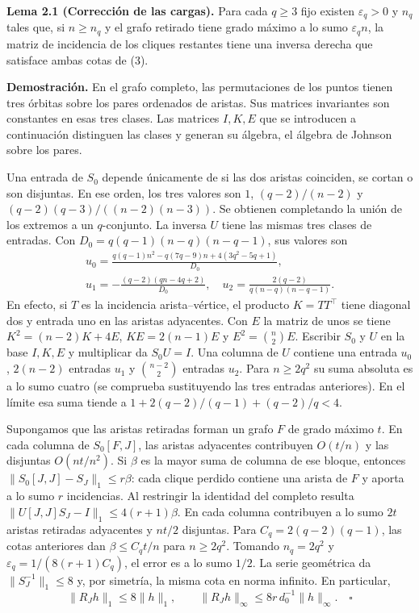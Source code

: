 \documentclass[spanish,11pt,a4paper]{article}
\begin{document}
\textbf{Lema 2.1 (Corrección de las cargas).} Para cada \(q\ge3\) fijo existen \(\varepsilon_q>0\) y \(n_q\) tales que, si \(n\ge n_q\) y el grafo retirado tiene grado máximo a lo sumo \(\varepsilon_q n\), la matriz de incidencia de los cliques restantes tiene una inversa derecha que satisface ambas cotas de (3).

\textbf{Demostración.} En el grafo completo, las permutaciones de los puntos tienen tres órbitas sobre los pares ordenados de aristas. Sus matrices invariantes son constantes en esas tres clases. Las matrices \(I,K,E\) que se introducen a continuación distinguen las clases y generan su álgebra, el álgebra de Johnson sobre los pares.

Una entrada de \(S_0\) depende únicamente de si las dos aristas coinciden, se cortan o son disjuntas. En ese orden, los tres valores son \(1\), \((q-2)/(n-2)\) y \((q-2)(q-3)/((n-2)(n-3))\). Se obtienen completando la unión de los extremos a un \(q\)-conjunto. La inversa \(U\) tiene las mismas tres clases de entradas. Con \(D_0=q(q-1)(n-q)(n-q-1)\), sus valores son \[\begin{gathered}u_0=\frac{q(q-1)n^2-q(7q-9)n+4(3q^2-5q+1)}{D_0},\\[3pt]
 u_1=-\frac{(q-2)(qn-4q+2)}{D_0},\quad
 u_2=\frac{2(q-2)}{q(n-q)(n-q-1)} .\end{gathered}\] En efecto, si \(T\) es la incidencia arista--vértice, el producto \(K=TT^\top\) tiene diagonal dos y entrada uno en las aristas adyacentes. Con \(E\) la matriz de unos se tiene \(K^2=(n-2)K+4E\), \(KE=2(n-1)E\) y \(E^2=\binom n2E\). Escribir \(S_0\) y \(U\) en la base \(I,K,E\) y multiplicar da \(S_0U=I\). Una columna de \(U\) contiene una entrada \(u_0\), \(2(n-2)\) entradas \(u_1\) y \(\binom{n-2}2\) entradas \(u_2\). Para \(n\ge2q^2\) su suma absoluta es a lo sumo cuatro (se comprueba sustituyendo las tres entradas anteriores). En el límite esa suma tiende a \(1+2(q-2)/(q-1)+(q-2)/q<4\).

Supongamos que las aristas retiradas forman un grafo \(F\) de grado máximo \(t\). En cada columna de \(S_0[F,J]\), las aristas adyacentes contribuyen \(O(t/n)\) y las disjuntas \(O(nt/n^2)\). Si \(\beta\) es la mayor suma de columna de ese bloque, entonces \(\|S_0[J,J]-S_J\|_1\le r\beta\): cada clique perdido contiene una arista de \(F\) y aporta a lo sumo \(r\) incidencias. Al restringir la identidad del completo resulta \(\|U[J,J]S_J-I\|_1\le4(r+1)\beta\). En cada columna contribuyen a lo sumo \(2t\) aristas retiradas adyacentes y \(nt/2\) disjuntas. Para \(C_q=2(q-2)(q-1)\), las cotas anteriores dan \(\beta\le C_q t/n\) para \(n\ge2q^2\). Tomando \(n_q=2q^2\) y \(\varepsilon_q=1/(8(r+1)C_q)\), el error es a lo sumo \(1/2\). La serie geométrica da \(\|S_J^{-1}\|_1\le8\) y, por simetría, la misma cota en norma infinito. En particular, \[\|R_J h\|_1\le8\|h\|_1,\qquad
 \|R_J h\|_\infty\le 8r\,d_0^{-1}\|h\|_\infty . \quad\square\tag{3}\]
\end{document}
